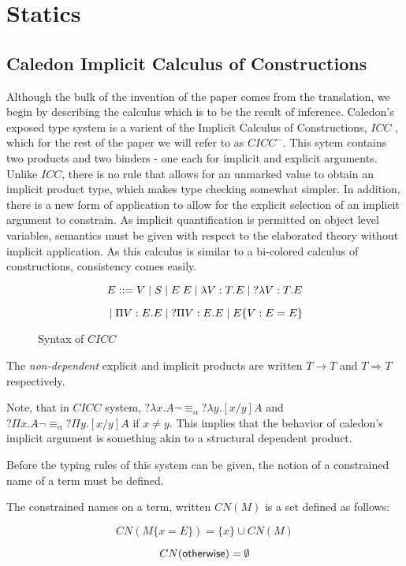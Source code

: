 \section{Statics}

\subsection{Caledon Implicit Calculus of Constructions}

Although the bulk of the invention of the paper comes from the translation, 
we begin by describing the calculus which is to be the result of inference.
Caledon's exposed type system is a varient of the Implicit Calculus of Constructions, $ICC$ \citep{miquel2001implicit}, 
which for the rest of the paper we will refer to as $CICC^{-}$.  
This sytem contains two products and two binders - one each for implicit and explicit arguments. 
Unlike $ICC$, there is no rule that allows for an unmarked value to obtain an implicit product type, which
makes type checking somewhat simpler.  
In addition, there is a new form of application to allow for the explicit
selection of an implicit argument to constrain. 
As implicit quantification is permitted on object level variables, semantics must be given with respect to 
the elaborated theory without implicit application.  As this calculus is similar to a bi-colored calculus of constructions, consistency comes easily.

\begin{figure}[H]
\[ 
E ::= 
V 
\; | \; S 
\; | \; E\;E 
\; | \; \lambda V : T. E 
\; | \; ?\lambda V : T. E 
\]

\[
\; | \; \Pi V : E . E 
\; | \; ?\Pi V : E . E 
\; | \; E \{ V : E = E \}
\]

\caption{Syntax of $CICC$}
\label{cicc:syntax}
\end{figure}

The \textit{non-dependent} explicit and implicit products are written $T \rightarrow T$ 
and $T \Rightarrow T$ respectively.

Note, that in $CICC$ system, $?\lambda x . A \neg\equiv_\alpha ?\lambda y . [x / y] A$ 
and $?\Pi x . A \neg\equiv_\alpha ?\Pi y . [x / y] A$  if $x \neq y$.  
This implies that the behavior of caledon's implicit argument is something akin to a structural dependent product.  

Before the typing rules of this system can be given, the notion of a constrained name of a term must be defined.

\begin{definition}
The constrained names on a term, written $CN(M)$ is a set defined as follows:

\[
CN(M \{ x = E \}) = \{ x \} \cup CN(M)
\]

\[ 
CN(\mathsf{otherwise}) = \emptyset
\]

\end{definition}

